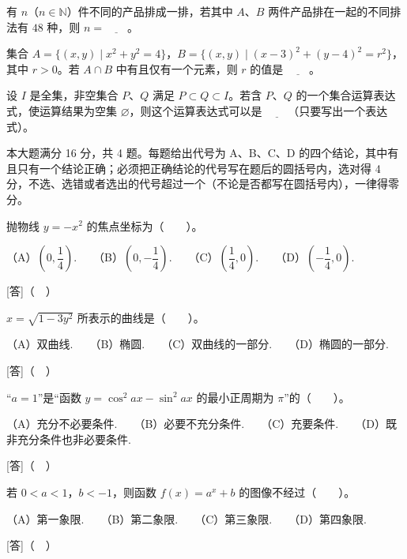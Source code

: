 \begin{question}
有 $n$（$n\in\mathbb{N}$）件不同的产品排成一排，若其中 $A$、$B$ 两件产品排在一起的不同排法有 $48$ 种，则 $n=\underline{\qquad}$。

\end{question}
\begin{question}
集合 $A=\{(x,y)\mid x^2+y^2=4\}$，$B=\{(x,y)\mid (x-3)^2+(y-4)^2=r^2\}$，其中 $r>0$。若 $A\cap B$ 中有且仅有一个元素，则 $r$ 的值是 $\underline{\qquad}$。

\end{question}
\begin{question}
设 $I$ 是全集，非空集合 $P$、$Q$ 满足 $P\subset Q\subset I$。若含 $P$、$Q$ 的一个集合运算表达式，使运算结果为空集 $\varnothing$，则这个运算表达式可以是 $\underline{\qquad}$（只要写出一个表达式）。

\end{question}

本大题满分 16 分，共 4 题。每题给出代号为 A、B、C、D 的四个结论，其中有且只有一个结论正确；必须把正确结论的代号写在题后的圆括号内，选对得 4 分，不选、选错或者选出的代号超过一个（不论是否都写在圆括号内），一律得零分。

\begin{question}
抛物线 $y=-x^2$ 的焦点坐标为\mbox{（　　）}。

（A）$(0,\dfrac{1}{4})$.　　（B）$(0,-\dfrac{1}{4})$.　　（C）$(\dfrac{1}{4},0)$.　　（D）$(-\dfrac{1}{4},0)$.

[答]（　）

\end{question}
\begin{question}
$x=\sqrt{1-3y^2}$ 所表示的曲线是\mbox{（　　）}。

（A）双曲线.　　（B）椭圆.　　（C）双曲线的一部分.　　（D）椭圆的一部分.

[答]（　）

\end{question}
\begin{question}
“$a=1$”是“函数 $y=\cos^2 ax-\sin^2 ax$ 的最小正周期为 $\pi$”的\mbox{（　　）}。

（A）充分不必要条件.　　（B）必要不充分条件.　　（C）充要条件.　　（D）既非充分条件也非必要条件.

[答]（　）

\end{question}
\begin{question}
若 $0<a<1$，$b<-1$，则函数 $f(x)=a^x+b$ 的图像不经过\mbox{（　　）}。

（A）第一象限.　　（B）第二象限.　　（C）第三象限.　　（D）第四象限.

[答]（　）

\end{question}

